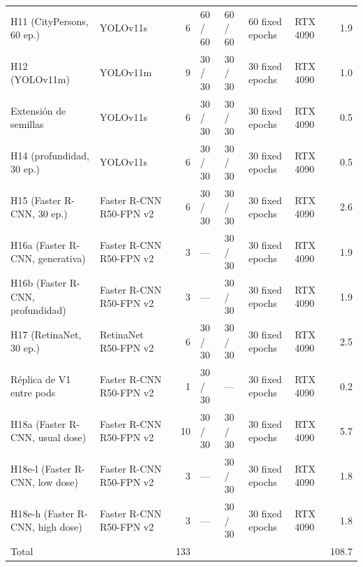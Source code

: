 \begin{table}[H]
{\begin{tabular}{@{}l l r l l l l r@{}}
H11 (CityPersons, 60 ep.) & YOLOv11s & 6 & 60 / 60 & 60 / 60 & 60 fixed epochs & RTX 4090 & 1.9 \\
H12 (YOLOv11m) & YOLOv11m & 9 & 30 / 30 & 30 / 30 & 30 fixed epochs & RTX 4090 & 1.0 \\
Extensión de semillas & YOLOv11s & 6 & 30 / 30 & 30 / 30 & 30 fixed epochs & RTX 4090 & 0.5 \\
H14 (profundidad, 30 ep.) & YOLOv11s & 6 & 30 / 30 & 30 / 30 & 30 fixed epochs & RTX 4090 & 0.5 \\
H15 (Faster R-CNN, 30 ep.) & Faster R-CNN R50-FPN v2 & 6 & 30 / 30 & 30 / 30 & 30 fixed epochs & RTX 4090 & 2.6 \\
H16a (Faster R-CNN, generativa) & Faster R-CNN R50-FPN v2 & 3 & --- & 30 / 30 & 30 fixed epochs & RTX 4090 & 1.9 \\
H16b (Faster R-CNN, profundidad) & Faster R-CNN R50-FPN v2 & 3 & --- & 30 / 30 & 30 fixed epochs & RTX 4090 & 1.9 \\
H17 (RetinaNet, 30 ep.) & RetinaNet R50-FPN v2 & 6 & 30 / 30 & 30 / 30 & 30 fixed epochs & RTX 4090 & 2.5 \\
Réplica de V1 entre pods & Faster R-CNN R50-FPN v2 & 1 & 30 / 30 & --- & 30 fixed epochs & RTX 4090 & 0.2 \\
H18a (Faster R-CNN, usual dose) & Faster R-CNN R50-FPN v2 & 10 & 30 / 30 & 30 / 30 & 30 fixed epochs & RTX 4090 & 5.7 \\
H18e-l (Faster R-CNN, low dose) & Faster R-CNN R50-FPN v2 & 3 & --- & 30 / 30 & 30 fixed epochs & RTX 4090 & 1.8 \\
H18e-h (Faster R-CNN, high dose) & Faster R-CNN R50-FPN v2 & 3 & --- & 30 / 30 & 30 fixed epochs & RTX 4090 & 1.8 \\
\midrule Total & & 133 & & & & & 108.7 \\
\bottomrule\end{tabular}}\end{table}
